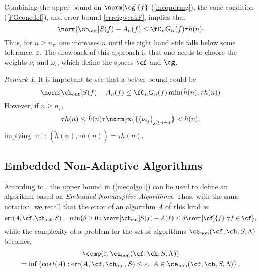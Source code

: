 \documentclass[final]{elsarticle}
\newcommand{\chout}{\ch_{\text{\rm{out}}}}
\DeclareMathOperator{\err}{err}
\DeclareMathOperator{\non}{non}
\theoremstyle{definition}
\theoremstyle{remark}
\newtheorem{rem}{Remark}
\begin{document}
Combining the upper bound on $\norm[\cg]{f}$ (\ref{ineqnormg}), the cone condition (\ref{FGconedef}), and error bound \eqref{erreigweakF}, implies that
\begin{equation}\label{ineqalgo1}
\norm[\chout]{S(f)-A_n(f)} \le \fC_n G_n(f) \tau h(n). %
\end{equation}
Thus, for $n\ge n_\tau$, one increases $n$ until the right hand side falls below some tolerance, $\varepsilon$.  The drawback of this approach is that one needs to choose the weights $\nu_i$ and $\omega_i$, which define the spaces $\cf$ and $\cg$.

\begin{rem}
It is important to see that a better bound could be
\begin{equation*}
\norm[\chout]{S(f)-A_n(f)} \le \fC_n G_n(f) \min(\tilde{h}(n) , \tau h(n))
\end{equation*}
However, if $n\ge n_\tau$,
\begin{equation*}
\tau h(n) \le \tilde{h}(n) \tau \norm[\infty]{\left(\nu_{i_j} \right)_{j\ge n+1}} < \tilde{h}(n),
\end{equation*}
implying $\min(\tilde{h}(n) , \tau h(n))=\tau h(n)$.
\end{rem}

\subsection{Embedded Non-Adaptive Algorithms}

According to \cite{HicEtal14b}, the upper bound in (\ref{ineqalgo1}) can be used to define an algorithm based on \textit{Embedded Nonadaptive Algorithms}. Thus, with the same notation, we recall that the error of an algorithm $A$ of this kind is:
\begin{equation} \label{errdefworst}
\err(A,\cf,\chout,S)
= \min\{ \delta \ge 0 : \norm[\chout]{S(f) -  A(f)} \le \delta \norm[\cf]{f} \ \forall f \in \cf \},
\end{equation}
while the complexity of a problem for the set of algorithms $\ca_{\non}(\cf,\ch,S,\Lambda)$ becomes,
\begin{multline} \label{fixcostcomplex}
\comp(\varepsilon,\ca_{\non}(\cf,\ch,S,\Lambda)) \\
= \inf\left\{\cos
t(A) : \err(A,\cf,\chout,S) \le \varepsilon, \ A \in \ca_{\non}(\cf,\ch,S,\Lambda) \right \}.
\end{multline}
\end{document}
